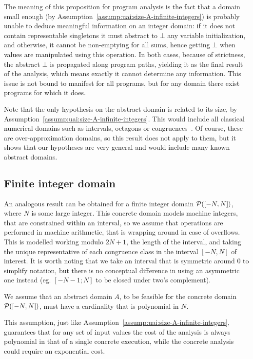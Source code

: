 The meaning of this proposition for program analysis is the fact that a domain small enough (by Assumption~\ref{assump:uai:size-A-infinite-integers}) is probably unable to deduce meaningful information on an integer domain: if it does not contain representable singletons it must abstract to $\bot$ any variable initialization, and otherwise, it cannot be non-emptying for all sums, hence getting $\bot$ when values are manipulated using this operation. In both cases, because of strictness, the abstract $\bot$ is propagated along program paths, yielding it as the final result of the analysis, which means exactly it cannot determine any information. This issue is not bound to manifest for all programs, but for any domain there exist programs for which it does.

Note that the only hypothesis on the abstract domain is related to its size, by Assumption~\ref{assump:uai:size-A-infinite-integers}. This would include all classical numerical domains such as intervals, octagons or congruences~\cite{Granger91}. Of course, these are over-approximation domains, so this result does not apply to them, but it shows that our hypotheses are very general and would include many known abstract domains.

\subsection{Finite integer domain}\label{sec:uai:integers-finite}
An analogous result can be obtained for a finite integer domain $\mathcal{P}([-N, N])$, where $N$ is some large integer. This concrete domain models machine integers, that are constrained within an interval, so we assume that operations are performed in machine arithmetic, that is wrapping around in case of overflows. This is modelled working modulo $2N + 1$, the length of the interval, and taking the unique representative of each congruence class in the interval $[-N, N]$ of interest. It is worth noting that we take an interval that is symmetric around $0$ to simplify notation, but there is no conceptual difference in using an asymmetric one instead (eg. $[-N -1; N]$ to be closed under two's complement).
\begin{assump}\label{assump:uai:size-A-finite-integers}
	We assume that an abstract domain $A$, to be feasible for the concrete domain $\mathcal{P}([-N, N])$, must have a cardinality that is polynomial in $N$.
\end{assump}
This assumption, just like Assumption~\ref{assump:uai:size-A-infinite-integers}, guarantees that for any set of input values the cost of the analysis is always polynomial in that of a single concrete execution, while the concrete analysis could require an exponential cost.

